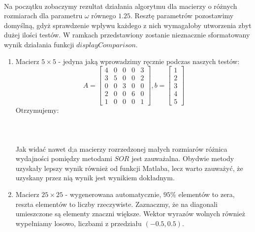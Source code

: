 \documentclass{article}
\begin{document}
\paragraph{}
Na początku zobaczymy rezultat działania algorytmu dla macierzy o różnych rozmiarach dla parametru $\omega$ równego $1.25$. Resztę parametrów pozostawimy domyślną, gdyż sprawdzenie wpływu każdego z nich wymagałoby utworzenia zbyt dużej ilości testów. W ramkach przedstawiony zostanie nieznacznie sformatowany wynik działania funkcji $displayComparison$.
\begin{enumerate}
\item Macierz $5 \times 5 $ - jedyna jaką wprowadzimy ręcznie podczas naszych testów:
$$A = \begin{bmatrix}
4 & 0 & 0 & 0 & 3\\
3 & 5 & 0 & 0 & 2\\
0 & 0 & 3 & 0 & 0\\
2 & 0 & 0 & 6 & 0\\
1 & 0 & 0 & 0 & 1
\end{bmatrix}, 
b = \begin{bmatrix}
1\\
2\\
3\\
4\\
5
\end{bmatrix}$$
Otrzymujemy:\\\\
\noindent{}\\\\
Jak widać nawet d;a macierzy rozrzedzonej małych rozmiarów różnica wydajności pomiędzy metodami $SOR$ jest zauważalna. Obydwie metody uzyskały lepszy wynik również od funkcji Matlaba, lecz warto zauważyć, że uzyskany przez nią wynik jest wynikiem dokładnym.
\item Macierz $25 \times 25$ - wygenerowana automatycznie, $95\%$ elementów to zera, reszta elementów to liczby rzeczywiste. Zaznaczmy, że na diagonali umieszczone są elementy znaczni większe. Wektor wyrazów wolnych również wypełniamy losowo, liczbami z przedziału $(-0.5,0.5)$.\\

\end{enumerate}
\end{document}

